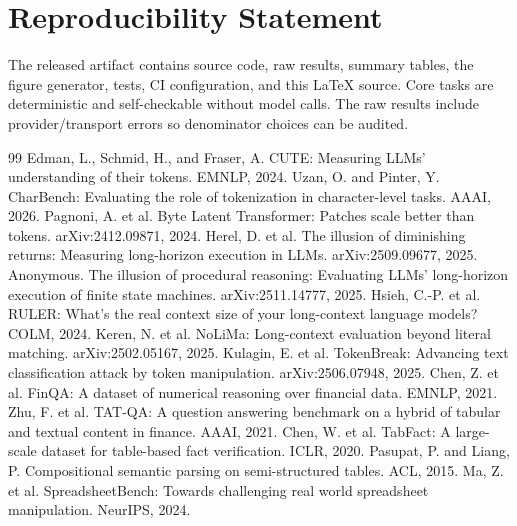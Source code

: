 \documentclass[10pt,twocolumn]{article}
\begin{document}
\section*{Reproducibility Statement}
The released artifact contains source code, raw results, summary tables, the figure generator, tests, CI configuration, and this LaTeX source. Core tasks are deterministic and self-checkable without model calls. The raw results include provider/transport errors so denominator choices can be audited.

\begin{thebibliography}{99}\small
{} Edman, L., Schmid, H., and Fraser, A. CUTE: Measuring LLMs' understanding of their tokens. EMNLP, 2024.
 Uzan, O. and Pinter, Y. CharBench: Evaluating the role of tokenization in character-level tasks. AAAI, 2026.
 Pagnoni, A. et al. Byte Latent Transformer: Patches scale better than tokens. arXiv:2412.09871, 2024.
 Herel, D. et al. The illusion of diminishing returns: Measuring long-horizon execution in LLMs. arXiv:2509.09677, 2025.
 Anonymous. The illusion of procedural reasoning: Evaluating LLMs' long-horizon execution of finite state machines. arXiv:2511.14777, 2025.
 Hsieh, C.-P. et al. RULER: What's the real context size of your long-context language models? COLM, 2024.
 Keren, N. et al. NoLiMa: Long-context evaluation beyond literal matching. arXiv:2502.05167, 2025.
 Kulagin, E. et al. TokenBreak: Advancing text classification attack by token manipulation. arXiv:2506.07948, 2025.
 Chen, Z. et al. FinQA: A dataset of numerical reasoning over financial data. EMNLP, 2021.
 Zhu, F. et al. TAT-QA: A question answering benchmark on a hybrid of tabular and textual content in finance. AAAI, 2021.
 Chen, W. et al. TabFact: A large-scale dataset for table-based fact verification. ICLR, 2020.
 Pasupat, P. and Liang, P. Compositional semantic parsing on semi-structured tables. ACL, 2015.
 Ma, Z. et al. SpreadsheetBench: Towards challenging real world spreadsheet manipulation. NeurIPS, 2024.

\end{thebibliography}
\end{document}

